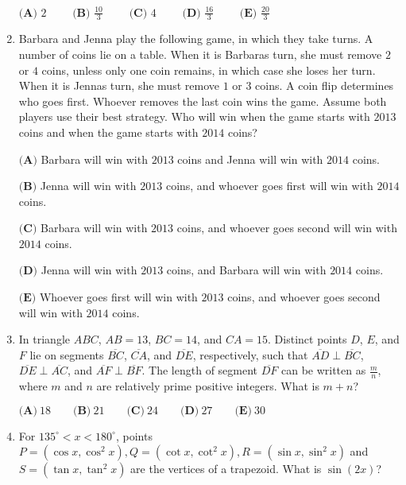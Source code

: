\documentclass{article}
\begin{document}
\begin{enumerate}[label=\arabic*., itemsep=0.5em]
\( \textbf{(A) }2\qquad \textbf{ (B) }\frac{10}{3}\qquad \textbf{ (C) }4 \qquad \textbf{ (D) }\frac{16}{3}\qquad \textbf{ (E) }\frac{20}{3} \)\par \vspace{0.5em}\item Barbara and Jenna play the following game, in which they take turns. A number of coins lie on a table. When it is Barbaras turn, she must remove \(2\) or \(4\) coins, unless only one coin remains, in which case she loses her turn. When it is Jennas turn, she must remove \(1\) or \(3\) coins. A coin flip determines who goes first. Whoever removes the last coin wins the game. Assume both players use their best strategy. Who will win when the game starts with \(2013\) coins and when the game starts with \(2014\) coins?

\( \textbf{(A)}\) Barbara will win with \(2013\) coins and Jenna will win with \(2014\) coins. 

\(\textbf{(B)}\) Jenna will win with \(2013\) coins, and whoever goes first will win with \(2014\) coins. 

\(\textbf{(C)}\) Barbara will win with \(2013\) coins, and whoever goes second will win with \(2014\) coins.

\(\textbf{(D)}\) Jenna will win with \(2013\) coins, and Barbara will win with \(2014\) coins.

\(\textbf{(E)}\) Whoever goes first will win with \(2013\) coins, and whoever goes second will win with \(2014\) coins.\par \vspace{0.5em}\item In triangle \(ABC\), \(AB=13\), \(BC=14\), and \(CA=15\). Distinct points \(D\), \(E\), and \(F\) lie on segments \(\overline{BC}\), \(\overline{CA}\), and \(\overline{DE}\), respectively, such that \(\overline{AD}\perp\overline{BC}\), \(\overline{DE}\perp\overline{AC}\), and \(\overline{AF}\perp\overline{BF}\). The length of segment \(\overline{DF}\) can be written as \(\frac{m}{n}\), where \(m\) and \(n\) are relatively prime positive integers. What is \(m+n\)?

\( \textbf{(A)}\ 18\qquad\textbf{(B)}\ 21\qquad\textbf{(C)}\ 24\qquad\textbf{(D)}\ 27\qquad\textbf{(E)}\ 30 \)\par \vspace{0.5em}\item For \(135^\circ < x < 180^\circ\), points \(P=(\cos x, \cos^2 x), Q=(\cot x, \cot^2 x), R=(\sin x, \sin^2 x)\) and \(S =(\tan x, \tan^2 x)\) are the vertices of a trapezoid. What is \(\sin(2x)\)?


\end{enumerate}
\end{document}
